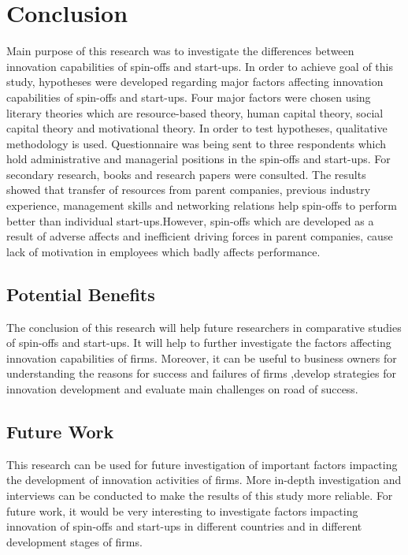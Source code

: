 \chapter{Conclusion}
Main purpose of this research was to investigate the differences between innovation capabilities of
spin-offs and start-ups. In order to achieve goal of this study, hypotheses were developed regarding
major factors affecting innovation capabilities of spin-offs and start-ups. Four major factors were
chosen using literary theories which are resource-based theory, human capital theory, social capital
theory and motivational theory. In order to test hypotheses, qualitative methodology is used.
Questionnaire was being sent to three respondents which hold administrative and managerial positions in the
spin-offs and start-ups. For secondary research, books and research papers were consulted. The
results showed that transfer of resources from parent companies, previous industry experience,
management skills and networking relations help spin-offs to perform better than individual start-ups.However, spin-offs which are developed as a result of adverse affects and inefficient driving
forces in parent companies, cause lack of motivation in employees which badly affects
performance.

\section{Potential Benefits}
The conclusion of this research will help future researchers in comparative studies of spin-offs and
start-ups. It will help to further investigate the factors affecting innovation capabilities of firms.
Moreover, it can be useful to business owners for understanding the reasons for success and failures
of firms ,develop strategies for innovation development and evaluate main
challenges on road of success.
\section{Future Work}
This research can be used for future investigation of important factors impacting
the development of innovation activities of firms. More in-depth investigation and interviews can be conducted
to make the results of this study more reliable. For future work, it would be very interesting to investigate
factors impacting innovation of spin-offs and start-ups in different countries and in different development stages
of firms.
